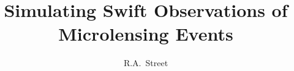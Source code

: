 \documentclass[preprint2]{aastex}
\begin{document}

\title{Simulating Swift Observations of Microlensing Events}


\author{R.A.~Street}






\end{document}
